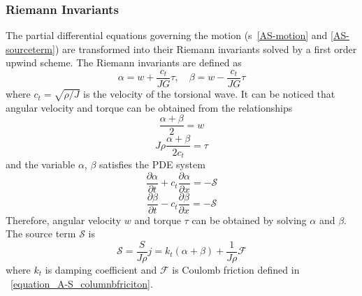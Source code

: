 \subsubsection{Riemann Invariants}
The partial differential equations governing the motion (\equationname{}s~\ref{AS-motion} and \ref{AS-sourceterm}) are transformed into their Riemann invariants solved by a first order upwind scheme. The Riemann invariants are defined as
\begin{equation}\label{AS-Riemann}
  \alpha = w + \frac{c_t}{JG}\tau, \quad \beta=w-\frac{c_t}{JG}\tau
\end{equation}
where $c_t = \sqrt{\rho/J}$ is the velocity of the torsional wave. It can be noticed that angular velocity and torque can be obtained from the relationships
\begin{equation}\label{equation_Riemann_relation1}
  \frac{\alpha + \beta}{2} = w
\end{equation}
\begin{equation}\label{equation_Riemann_relation2}
  J \rho \frac{\alpha + \beta}{2c_t} = \tau
\end{equation}
and the variable $\alpha$, $\beta$ satisfies the PDE system
\begin{equation}\label{AS-Riemann_alpha}
  \frac{\partial \alpha}{\partial t} + c_t\frac{\partial \alpha}{\partial x} = -\mathcal{S}
\end{equation}
\begin{equation}\label{AS-Riemann_beta}
  \frac{\partial \beta}{\partial t} - c_t\frac{\partial \beta}{\partial x} = -\mathcal{S}
\end{equation}
Therefore, angular velocity $w$ and torque $\tau$ can be obtained by solving $\alpha$ and $\beta$.
The source term $\mathcal{S}$ is
\begin{equation}\label{AS-source}
  \mathcal{S} = \frac{S}{J \rho} j= k_t(\alpha + \beta) + \frac{1}{J \rho} \mathcal{F}
\end{equation} 
where $k_t$ is damping coefficient and $\mathcal{F}$ is Coulomb friction defined in \equationname~\ref{equation_A-S_columnbfriciton}.
